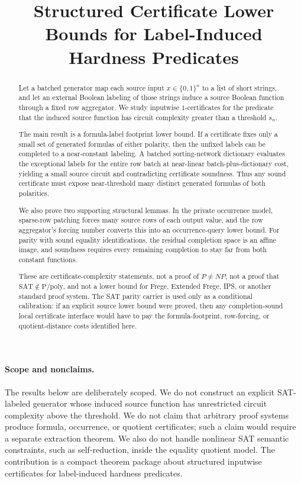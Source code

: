 %
%
%
\title{Structured Certificate Lower Bounds for Label-Induced Hardness Predicates}

\begin{abstract}
Let a batched generator map each source input \(x\in\{0,1\}^n\) to a list of
short strings, and let an external Boolean labeling of those strings induce a
source Boolean function through a fixed row aggregator.  We study inputwise
\(1\)-certificates for the predicate that the induced source function has
circuit complexity greater than a threshold \(s_n\).

The main result is a formula-label footprint lower bound.  If a certificate
fixes only a small set of generated formulas of either polarity, then the
unfixed labels can be completed to a near-constant labeling.  A batched
sorting-network dictionary evaluates the exceptional labels for the entire row
batch at near-linear batch-plus-dictionary cost, yielding a small source
circuit and contradicting certificate soundness.  Thus any sound certificate
must expose near-threshold many distinct generated formulas of both polarities.

We also prove two supporting structural lemmas.  In the private occurrence
model, sparse-row patching forces many source rows of each output value, and
the row aggregator's forcing number converts this into an occurrence-query
lower bound.  For parity with sound equality identifications, the residual
completion space is an affine image, and soundness requires every remaining
completion to stay far from both constant functions.

These are certificate-complexity statements, not a proof of \(P\ne NP\), not a
proof that \(\mathrm{SAT}\notin\mathrm{P/poly}\), and not a lower bound for
Frege, Extended Frege, IPS, or another standard proof system.  The SAT parity
carrier is used only as a conditional calibration: if an explicit source lower
bound were proved, then any completion-sound local certificate interface would
have to pay the formula-footprint, row-forcing, or quotient-distance costs
identified here.
\end{abstract}

\paragraph{Scope and nonclaims.}
The results below are deliberately scoped.  We do not construct an explicit
SAT-labeled generator whose induced source function has unrestricted circuit
complexity above the threshold.  We do not claim that arbitrary proof systems
produce formula, occurrence, or quotient certificates; such a claim would
require a separate extraction theorem.  We also do not handle nonlinear SAT
semantic constraints, such as self-reduction, inside the equality quotient
model.  The contribution is a compact theorem package about structured
inputwise certificates for label-induced hardness predicates.
